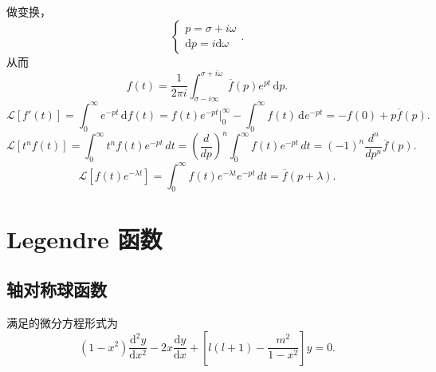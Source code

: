 \documentclass[12pt,a4paper,openany,twoside]{book}
\numberwithin{equation}{section}
\begin{document}
        做变换，
        \begin{equation}
        \begin{cases}
          p = \sigma + i \omega \\
          \mathrm{d}p = i\mathrm{d}\omega
        \end{cases}
        .
        \end{equation}
        从而
        \begin{equation}
          f(t) = \frac{1}{2\pi i} \int ^{\sigma + i \omega} _{\sigma - i \infty} \overline{f}(p) e^{p t} \, \mathrm{d}p 
        .
        \end{equation} 
        \begin{equation}
          \mathcal{L}[f'(t)] = \int ^\infty _0 e^{-pt} \, \mathrm{d}f(t) = f(t)e^{-pt} \bigg|^\infty_0 - \int ^\infty_0 f(t) \, \mathrm{d}e^{-pt} = -f(0) + p \overline{f}(p)   
        .
        \end{equation}
        \begin{equation}
          \mathcal{L}[t^n f(t)] = \int _0^\infty t^n f(t) e^{-pt} \, dt = \left( \frac{d }{d p}  \right) ^n \int_0 ^\infty f(t) e^{-pt} \, dt = (-1)^n \frac{d ^n}{d p^n} \overline{f}(p)  
        .
        \end{equation}
        \begin{equation}
          \mathcal{L}[f(t)e^{-\lambda t}] = \int _0^\infty f(t) e^{-\lambda t}  e^{-pt}\, dt = \overline{f}(p+\lambda) 
        .
        \end{equation} 

      \section{Legendre 函数}
        \subsection{轴对称球函数}
          满足的微分方程形式为
          \begin{equation}
            (1-x^2) \frac{\mathrm{d}^2 y}{\mathrm{d}x^2} -2x \frac{\mathrm{d} y}{\mathrm{d} x} +\left[ l(l+1) - \frac{m^2}{1-x^2} \right] y = 0
          .
          \end{equation}
\end{document}
